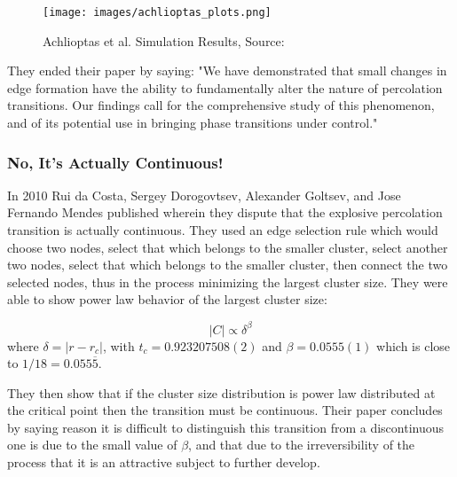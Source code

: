 \begin{figure}[H]
	\centering
	\texttt{[image: images/achlioptas\_plots.png]}
	\caption{Achlioptas et al. Simulation Results, Source: \cite{Achlioptas_1}}
	\label{fig:achlioptas_plots}
\end{figure}

They ended their paper by saying: "We have demonstrated that small changes in edge formation have the ability to fundamentally alter the nature of percolation transitions. Our findings call for the comprehensive study of this phenomenon, and of its potential use in bringing phase transitions under control." \cite{Achlioptas_1}



\subsubsection{No, It's Actually Continuous!}
In 2010 Rui da Costa, Sergey Dorogovtsev, Alexander Goltsev, and Jose Fernando Mendes published \cite{da_Costa_1} wherein they dispute that the explosive percolation transition is actually continuous.
They used an edge selection rule which would choose two nodes, select that which belongs to the smaller cluster, select another two nodes, select that which belongs to the smaller cluster, then connect the two selected nodes, thus in the process minimizing the largest cluster size.
They were able to show power law behavior of the largest cluster size:

\begin{equation}
	|C| \propto \delta^\beta
\end{equation}
where $\delta = |r - r_c|$, with $t_c = 0.923207508(2)$ and $\beta = 0.0555(1)$ which is close to $1/18 = 0.055\overline{5}$.

They then show that if the cluster size distribution is power law distributed at the critical point then the transition must be continuous.
Their paper concludes by saying reason it is difficult to distinguish this transition from a discontinuous one is due to the small value of $\beta$, and that due to the irreversibility of the process that it is an attractive subject to further develop.



